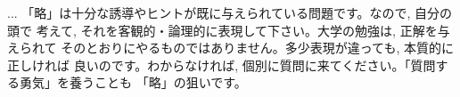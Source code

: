 \begin{freqmiss}{\small{}}\end{freqmiss}

\begin{faq}{\small{}
... 「略」は十分な誘導やヒントが既に与えられている問題です。なので, 自分の頭で
考えて, それを客観的・論理的に表現して下さい。大学の勉強は, 正解を与えられて
そのとおりにやるものではありません。多少表現が違っても, 本質的に正しければ
良いのです。わからなければ, 個別に質問に来てください。「質問する勇気」を養うことも
「略」の狙いです。}\end{faq}
